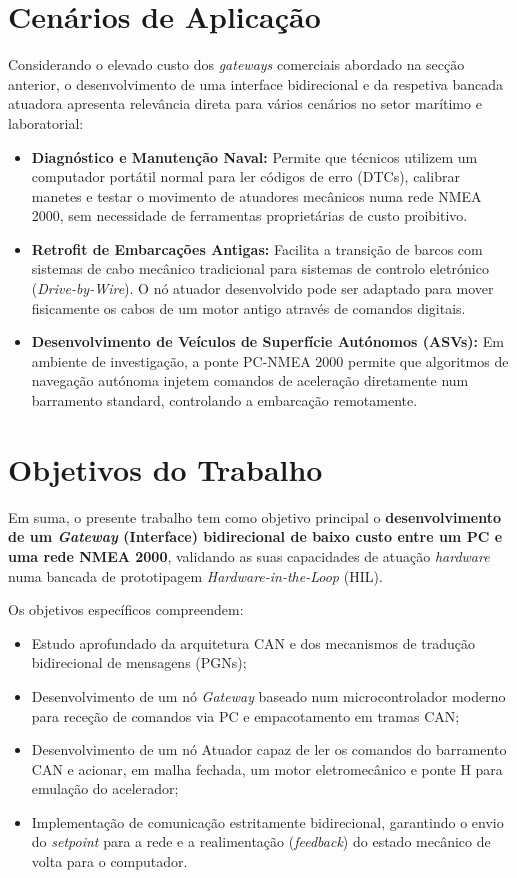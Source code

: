 \section{Cenários de Aplicação}
Considerando o elevado custo dos \textit{gateways} comerciais abordado na secção anterior, o desenvolvimento de uma interface bidirecional e da respetiva bancada atuadora apresenta relevância direta para vários cenários no setor marítimo e laboratorial:
\begin{itemize}
    \item \textbf{Diagnóstico e Manutenção Naval:} Permite que técnicos utilizem um computador portátil normal para ler códigos de erro (DTCs), calibrar manetes e testar o movimento de atuadores mecânicos numa rede NMEA 2000, sem necessidade de ferramentas proprietárias de custo proibitivo.
    \item \textbf{Retrofit de Embarcações Antigas:} Facilita a transição de barcos com sistemas de cabo mecânico tradicional para sistemas de controlo eletrónico (\textit{Drive-by-Wire}). O nó atuador desenvolvido pode ser adaptado para mover fisicamente os cabos de um motor antigo através de comandos digitais.
    \item \textbf{Desenvolvimento de Veículos de Superfície Autónomos (ASVs):} Em ambiente de investigação, a ponte PC-NMEA 2000 permite que algoritmos de navegação autónoma injetem comandos de aceleração diretamente num barramento standard, controlando a embarcação remotamente.
\end{itemize}

\section{Objetivos do Trabalho}
Em suma, o presente trabalho tem como objetivo principal o \textbf{desenvolvimento de um \textit{Gateway} (Interface) bidirecional de baixo custo entre um PC e uma rede NMEA 2000}, validando as suas capacidades de atuação \textit{hardware} numa bancada de prototipagem \textit{Hardware-in-the-Loop} (HIL).

Os objetivos específicos compreendem:
\begin{itemize}
    \item Estudo aprofundado da arquitetura CAN e dos mecanismos de tradução bidirecional de mensagens (PGNs);
    \item Desenvolvimento de um nó \textit{Gateway} baseado num microcontrolador moderno para receção de comandos via PC e empacotamento em tramas CAN;
    \item Desenvolvimento de um nó Atuador capaz de ler os comandos do barramento CAN e acionar, em malha fechada, um motor eletromecânico e ponte H para emulação do acelerador;
    \item Implementação de comunicação estritamente bidirecional, garantindo o envio do \textit{setpoint} para a rede e a realimentação (\textit{feedback}) do estado mecânico de volta para o computador.
\end{itemize}

